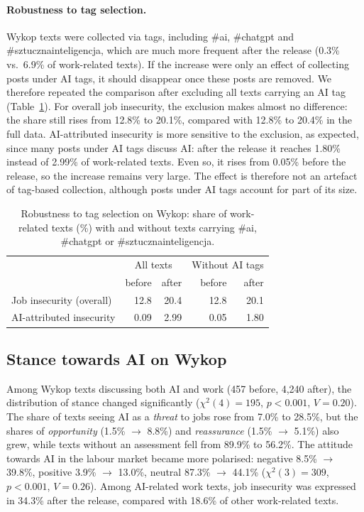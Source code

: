 \documentclass[11pt]{article}
\begin{document}
\paragraph{Robustness to tag selection.} Wykop texts were collected via
tags, including \#ai, \#chatgpt and \#sztucznainteligencja, which are much
more frequent after the release (0.3\% vs.\ 6.9\% of work-related texts).
If the increase were only an effect of collecting posts under AI tags, it
should disappear once these posts are removed. We therefore repeated the
comparison after excluding all texts carrying an AI tag
(Table~\ref{tab:robustness}). For overall job insecurity, the exclusion
makes almost no difference: the share still rises from 12.8\% to 20.1\%,
compared with 12.8\% to 20.4\% in the full data. AI-attributed insecurity
is more sensitive to the exclusion, as expected, since many posts under AI
tags discuss AI: after the release it reaches 1.80\% instead of 2.99\% of
work-related texts. Even so, it rises from 0.05\% before the release, so
the increase remains very large. The effect is therefore not an artefact
of tag-based collection, although posts under AI tags account for part of
its size.

\begin{table}[t]
\centering\small
\begin{tabular}{lrrrr}
\toprule
 & \multicolumn{2}{c}{All texts} & \multicolumn{2}{c}{Without AI tags} \\
 & before & after & before & after \\
\midrule
Job insecurity (overall) & 12.8 & 20.4 & 12.8 & 20.1 \\
AI-attributed insecurity & 0.09 & 2.99 & 0.05 & 1.80 \\
\bottomrule
\end{tabular}
\caption{Robustness to tag selection on Wykop: share of work-related texts
(\%) with and without texts carrying \#ai, \#chatgpt or
\#sztucznainteligencja.}
\label{tab:robustness}
\end{table}

\subsection{Stance towards AI on Wykop}

Among Wykop texts discussing both AI and work (457 before, 4,240 after), the
distribution of stance changed significantly ($\chi^2(4)=195$, $p<0.001$,
$V=0.20$). The share of texts seeing AI as a \emph{threat} to jobs rose from
7.0\% to 28.5\%, but the shares of \emph{opportunity} (1.5\% $\to$ 8.8\%) and
\emph{reassurance} (1.5\% $\to$ 5.1\%) also grew, while texts without an
assessment fell from 89.9\% to 56.2\%. The attitude towards AI in the labour
market became more polarised: negative 8.5\% $\to$ 39.8\%, positive 3.9\%
$\to$ 13.0\%, neutral 87.3\% $\to$ 44.1\% ($\chi^2(3)=309$, $p<0.001$,
$V=0.26$). Among AI-related work texts, job insecurity was expressed in 34.3\%
after the release, compared with 18.6\% of other work-related texts.
\end{document}
